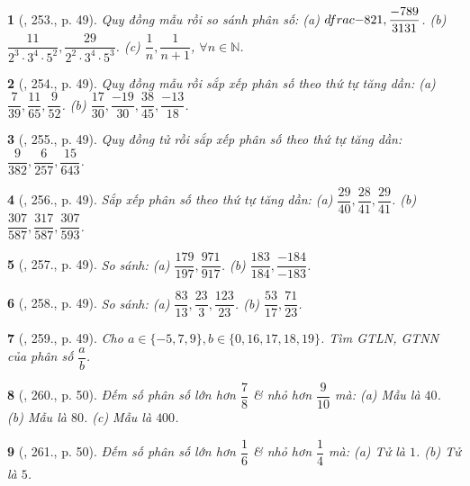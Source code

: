 \documentclass{article}
\newtheorem{baitoan}{}
\begin{document}
\begin{baitoan}[\cite{Tuyen_Toan_6}, 253., p. 49]
	Quy đồng mẫu rồi so sánh phân số: (a) $\\dfrac{-8}{21},\dfrac{-789}{3131}$. (b) $\dfrac{11}{2^3\cdot3^4\cdot5^2},\dfrac{29}{2^2\cdot3^4\cdot5^3}$. (c) $\dfrac{1}{n},\dfrac{1}{n + 1}$, $\forall n\in\mathbb{N}$.
\end{baitoan}

\begin{baitoan}[\cite{Tuyen_Toan_6}, 254., p. 49]
	Quy đồng mẫu rồi sắp xếp phân số theo thứ tự tăng dần: (a) $\dfrac{7}{39},\dfrac{11}{65},\dfrac{9}{52}$. (b) $\dfrac{17}{30},\dfrac{-19}{30},\dfrac{38}{45},\dfrac{-13}{18}$.
\end{baitoan}

\begin{baitoan}[\cite{Tuyen_Toan_6}, 255., p. 49]
	Quy đồng tử rồi sắp xếp phân số theo thứ tự tăng dần: $\dfrac{9}{382},\dfrac{6}{257},\dfrac{15}{643}$.
\end{baitoan}

\begin{baitoan}[\cite{Tuyen_Toan_6}, 256., p. 49]
	Sắp xếp phân số theo thứ tự tăng dần: (a) $\dfrac{29}{40},\dfrac{28}{41},\dfrac{29}{41}$. (b) $\dfrac{307}{587},\dfrac{317}{587},\dfrac{307}{593}$.
\end{baitoan}

\begin{baitoan}[\cite{Tuyen_Toan_6}, 257., p. 49]
	So sánh: (a) $\dfrac{179}{197},\dfrac{971}{917}$. (b) $\dfrac{183}{184},\dfrac{-184}{-183}$.
\end{baitoan}

\begin{baitoan}[\cite{Tuyen_Toan_6}, 258., p. 49]
	So sánh: (a) $\dfrac{83}{13},\dfrac{23}{3},\dfrac{123}{23}$. (b) $\dfrac{53}{17},\dfrac{71}{23}$.
\end{baitoan}

\begin{baitoan}[\cite{Tuyen_Toan_6}, 259., p. 49]
	Cho $a\in\{-5,7,9\},b\in\{0,16,17,18,19\}$. Tìm {\rm GTLN, GTNN} của phân số $\dfrac{a}{b}$.
\end{baitoan}

\begin{baitoan}[\cite{Tuyen_Toan_6}, 260., p. 50]
	Đếm số phân số lớn hơn $\dfrac{7}{8}$ \& nhỏ hơn $\dfrac{9}{10}$ mà: (a) Mẫu là $40$. (b) Mẫu là $80$. (c) Mẫu là $400$.
\end{baitoan}

\begin{baitoan}[\cite{Tuyen_Toan_6}, 261., p. 50]
	Đếm số phân số lớn hơn $\dfrac{1}{6}$ \& nhỏ hơn $\dfrac{1}{4}$ mà: (a) Tử là $1$. (b) Tử là $5$.
\end{baitoan}
\end{document}
